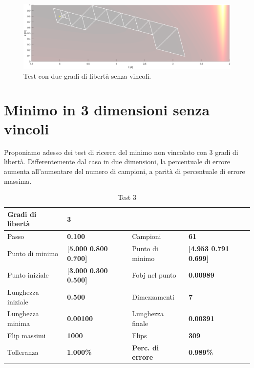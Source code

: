 \documentclass[a4paper, 11pt]{article}
\begin{document}
\begin{figure}[H]
    \centering
        \includegraphics[width=15cm]{assets/figure10}
        \caption{Test con due gradi di libertà senza vincoli.}
\end{figure}

\section{Minimo in 3 dimensioni senza vincoli}

Proponiamo adesso dei test di ricerca del minimo non vincolato con 3 gradi di
libertà. Differentemente dal caso in due dimensioni, la percentuale di errore
aumenta all'aumentare del numero di campioni, a parità di percentuale di errore
massima.

\begin{table}[h]
    \caption{Test 3}
    \begin{center}
    \begin{tabular}{|l|l|l|l|} 
    \hline 
Gradi di libertà & \textbf{3} &  &  \\ \hline 
Passo & \textbf{0.100} & Campioni & \textbf{61} \\ \hline 
Punto di minimo & \textbf{{[}5.000 0.800 0.700{]}} & Punto di minimo &
\textbf{{[}4.953 0.791 0.699{]}} \\ \hline 
Punto iniziale & \textbf{{[}3.000 0.300 0.500{]}} & Fobj nel punto &
\textbf{0.00989} \\ \hline 
Lunghezza iniziale & \textbf{0.500} & Dimezzamenti & \textbf{7} \\ \hline 
Lunghezza minima & \textbf{0.00100} & Lunghezza finale & \textbf{0.00391} \\
\hline
Flip massimi & \textbf{1000} & Flips & \textbf{309} \\ \hline 
Tolleranza & \textbf{1.000\%} & \textbf{Perc. di errore} & \textbf{0.989\%} \\
\hline 
    \end{tabular}
    \end{center}
    \end{table}
\end{document}

